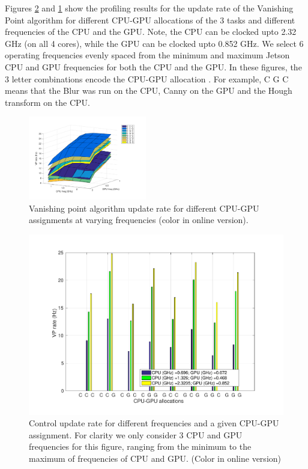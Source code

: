 

Figures \ref{fig:dfsa} and \ref{fig:sfda} show the profiling results for the update rate of the Vanishing Point algorithm for different CPU-GPU allocations of the 3 tasks and different frequencies of the CPU and the GPU. 
Note, the CPU can be clocked upto 2.32 GHz (on all 4 cores), while the GPU can be clocked upto 0.852 GHz. 
We select 6 operating frequencies evenly spaced from the minimum and maximum Jetson CPU and GPU frequencies for both the CPU and the GPU. 
In these figures, the 3 letter combinations encode the CPU-GPU allocation .
For example, C G C means that the Blur was run on the CPU, Canny on the GPU and the Hough transform on the CPU.


\begin{figure}[htbp]
	\centering
	\includegraphics[width=0.46\textwidth]{Figs/surf_Rate.pdf}
	\caption{Vanishing point algorithm update rate for different CPU-GPU assignments at varying frequencies (color in online version).}
	\label{fig:sfda}%
\end{figure}

\begin{figure}[hbtp]
\centering
\includegraphics[scale=0.3]{Figs/RateHist.pdf}
\caption{Control update rate for different frequencies and a given CPU-GPU assignment. For clarity we only consider 3 CPU and GPU frequencies for this figure, ranging from the minimum to the maximum of frequencies of CPU and GPU. (Color in online version) }
\label{fig:dfsa} %
\end{figure}

